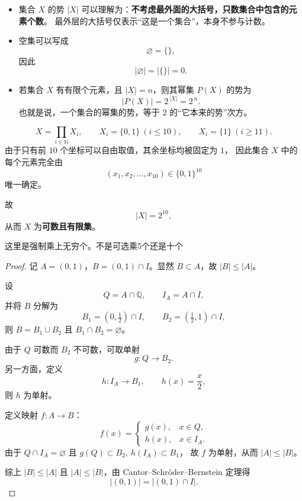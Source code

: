\begin{note}
\begin{itemize}
  \item 集合 $X$ 的势 $|X|$ 可以理解为：\textbf{不考虑最外面的大括号，只数集合中包含的元素个数}。
  最外层的大括号仅表示“这是一个集合”，本身不参与计数。
  
  \item 空集可以写成
  \[
  \varnothing=\{\},
  \]
  因此
  \[
  |\varnothing|=|\{\}|=0.
  \]

  \item 若集合 $X$ 有有限个元素，且 $|X|=n$，则其幂集 $P(X)$ 的势为
  \[
  |P(X)|=2^{\,|X|}=2^{\,n}.
  \]
  也就是说，一个集合的幂集的势，等于 $2$ 的“它本来的势”次方。
\end{itemize}
\end{note}

\item[(7)]
\[
X=\prod_{i\in\mathbb N} X_i,\qquad 
X_i=\{0,1\}\ (i\le 10),\qquad X_i=\{1\}\ (i\ge 11).
\]
由于只有前 $10$ 个坐标可以自由取值，其余坐标均被固定为 $1$，
因此集合 $X$ 中的每个元素完全由
\[
(x_1,x_2,\dots,x_{10})\in\{0,1\}^{10}
\]
唯一确定。

故
\[
|X|=2^{10},
\]
从而 $X$ 为\textbf{可数且有限集}。

这里是强制乘上无穷个。不是可选乘5个还是十个




















\begin{proof}
记 $A=(0,1)$，$B=(0,1)\cap I$。显然 $B\subset A$，故 $|B|\le |A|$。

设
\[
Q=A\cap\mathbb Q,\qquad I_A=A\cap I,
\]
并将 $B$ 分解为
\[
B_1=(0,\tfrac12)\cap I,\qquad B_2=(\tfrac12,1)\cap I,
\]
则 $B=B_1\cup B_2$ 且 $B_1\cap B_2=\varnothing$。

由于 $Q$ 可数而 $B_2$ 不可数，可取单射
\[
g:Q\to B_2.
\]
另一方面，定义
\[
h:I_A\to B_1,\qquad h(x)=\frac{x}{2},
\]
则 $h$ 为单射。

定义映射 $f:A\to B$：
\[
f(x)=
\begin{cases}
g(x), & x\in Q,\\[4pt]
h(x), & x\in I_A.
\end{cases}
\]
由于 $Q\cap I_A=\varnothing$ 且 $g(Q)\subset B_2,\ h(I_A)\subset B_1$，
故 $f$ 为单射，从而 $|A|\le |B|$。

综上 $|B|\le |A|$ 且 $|A|\le |B|$，由 Cantor--Schr\"oder--Bernstein 定理得
\[
|(0,1)|=|(0,1)\cap I|.
\]
\end{proof}

